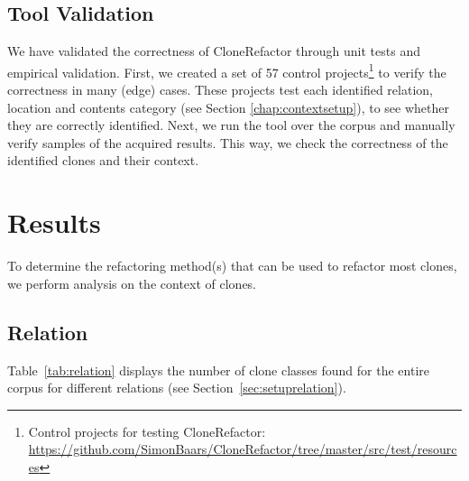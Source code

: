 \documentclass[runningheads]{llncs}
\begin{document}
\subsection{Tool Validation}
We have validated the correctness of CloneRefactor through unit tests and empirical validation. First, we created a set of 57 control projects\footnote{Control projects for testing CloneRefactor: \url{https://github.com/SimonBaars/CloneRefactor/tree/master/src/test/resources}} to verify the correctness in many (edge) cases. These projects test each identified relation, location and contents category (see Section \ref{chap:contextsetup}), to see whether they are correctly identified. Next, we run the tool over the corpus and manually verify samples of the acquired results. This way, we check the correctness of the identified clones and their context.

\section{Results}
To determine the refactoring method(s) that can be used to refactor most clones, we perform analysis on the context of clones.

\subsection{Relation} \label{sec:relationresults}
Table~\ref{tab:relation} displays the number of clone classes found for the entire corpus for different relations (see Section~\ref{sec:setuprelation}).
\end{document}
